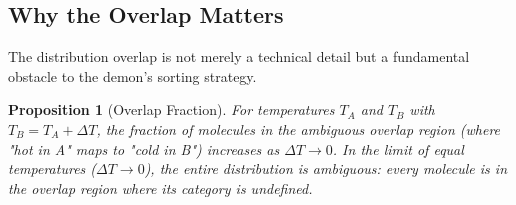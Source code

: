\documentclass[12pt,a4paper]{article}
\newtheorem{proposition}[theorem]{Proposition}
\theoremstyle{definition}
\theoremstyle{remark}
\begin{document}
\subsection{Why the Overlap Matters}

The distribution overlap is not merely a technical detail but a fundamental obstacle to the demon's sorting strategy.

\begin{proposition}[Overlap Fraction]
\label{prop:overlap_fraction}
For temperatures $T_A$ and $T_B$ with $T_B = T_A + \Delta T$, the fraction of molecules in the ambiguous overlap region (where "hot in A" maps to "cold in B") increases as $\Delta T \to 0$. In the limit of equal temperatures ($\Delta T \to 0$), the entire distribution is ambiguous: every molecule is in the overlap region where its category is undefined.
\end{proposition}
\end{document}
